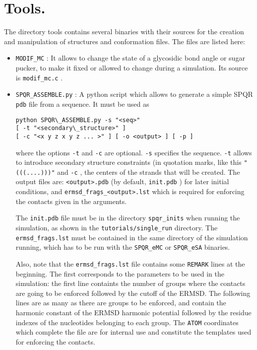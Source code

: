 \documentclass{article}
\begin{document}
\section{Tools.}

The directory tools contains several binaries with their sources for the creation and manipulation of structures and conformation files. The files are listed here:
\begin{itemize}

\item \texttt{MODIF\_MC} : It allows to change the state of a glycosidic bond angle or sugar pucker, to make it fixed or allowed to change during a simulation. Its source is \texttt{modif\_mc.c} .

\item \texttt{SPQR\_ASSEMBLE.py} : A python script which allows to generate a simple SPQR \texttt{pdb}  file from a sequence. It must be used as
\begin{verbatim}
python SPQR\_ASSEMBLE.py -s "<seq>" 
[ -t "<secondary\_structure>" ]
[ -c "<x y z x y z ... >" ] [ -o <output> ] [ -p ]
\end{verbatim}
where the options \texttt{-t} and \texttt{-c} are optional. \texttt{-s} specifies the sequence. \texttt{-t} allows to introduce secondary structure constraints (in quotation marks, like this \texttt{"(((....)))"} and \texttt{-c} , the centers of the strands that will be created.
The output files are: \texttt{<output>.pdb} (by default, \texttt{init.pdb} ) for later initial conditions, and \texttt{ermsd\_frags\_<output>.lst} which is required for enforcing the contacts given in the arguments.

The \texttt{init.pdb} file must be in the directory \texttt{spqr\_inits} when running the simulation, as shown in the \texttt{tutorials/single\_run} directory. The \texttt{ermsd\_frags.lst} must be contained in the same directory of the simulation running, which has to be run with the \texttt{SPQR\_eMC} or \texttt{SPQR\_eSA} binaries.

Also, note that the \texttt{ermsd\_frags.lst} file contains some \texttt{REMARK} lines at the beginning. The first corresponds to the parameters to be used in the simulation: the first line containts the number of groups where the contacts are going to be enforced followed by the cutoff of the ERMSD. The following lines are as many as there are groups to be enforced, and contain the harmonic constant of the ERMSD harmonic potential followed by the residue indexes of the nucleotides belonging to each group. The \texttt{ATOM} coordinates which complete the file are for internal use and constitute the templates used for enforcing the contacts.


\end{itemize}
\end{document}
